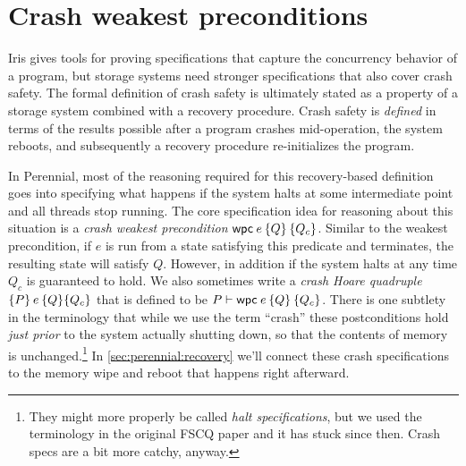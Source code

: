 \section{Crash weakest preconditions}

\newcommand{\propc}{P_c}
\newcommand{\propcB}{Q_c}
\newcommand{\propcC}{R_c}

\newcommand{\wpcseqfig}{%
\begin{mathpar}
\inferH{wpc-value}
{}{\propc \land [\val/\var]\prop \proves \wpc{\val}{\Ret\var \prop}{\propc}}

\inferH{wpc-mono}
{\propc \proves \propcB \and \forall \val.\,\left([\val/\var]\prop \proves [\val/\var]\propB\right)}
{\wpc\expr{\Ret\var \prop}{\propc} \proves \wpc\expr{\Ret\var \propB}{\propcB}}


\inferH{wpc-frame}
{}{\propB * \wpc\expr{\prop}{\propc} \proves \wpc\expr{\propB*\prop}{\propB*\propc}}

\inferH{wp-wpc}
{}{\wpre\expr{\Ret\var \prop} \dashv\proves \wpc\expr{\Ret\var \prop}{\TRUE}}


\inferH{wpc-atomic}
{\atomic(\expr)}
{\propc \land \wpre\expr{\Ret\var  \propc \land \prop}
 \proves \wpc\expr{\Ret\var \prop}{\propc}}
\end{mathpar}
}

Iris gives tools for proving specifications that capture the concurrency
behavior of a program, but storage systems need stronger specifications that
also cover crash safety. The formal definition of crash safety is ultimately
stated as a property of a storage system combined with a recovery procedure.
Crash safety is \emph{defined} in terms of the results possible after a program
crashes mid-operation, the system reboots, and subsequently a recovery procedure
re-initializes the program.

In Perennial, most of the reasoning required for this recovery-based definition
goes into specifying what happens if the system halts at some intermediate point
and all threads stop running. The core specification idea for reasoning about
this situation is a \emph{crash weakest precondition} $\wpc{e}{Q}{Q_{c}}$. Similar
to the weakest precondition, if $e$ is run from a state satisfying this
predicate and terminates, the resulting state will satisfy $Q$. However, in
addition if the system halts at any time $Q_{c}$ is guaranteed to hold. We also
sometimes write a \emph{crash Hoare quadruple} $\hoareC{P}{e}{Q}{Q_{c}}$ that is
defined to be $P \proves \wpc{e}{Q}{Q_{c}}$. There is one subtlety in the
terminology that while we use the term ``crash'' these postconditions hold
\emph{just prior} to the system actually shutting down, so that the contents of
memory is unchanged.\footnote{They might more properly be called \emph{halt
specifications}, but we used the terminology in the original FSCQ paper and it has
stuck since then. Crash specs are a bit more catchy, anyway.} In \autoref{sec:perennial:recovery} we'll connect these
crash specifications to the memory wipe and reboot that happens right afterward.


